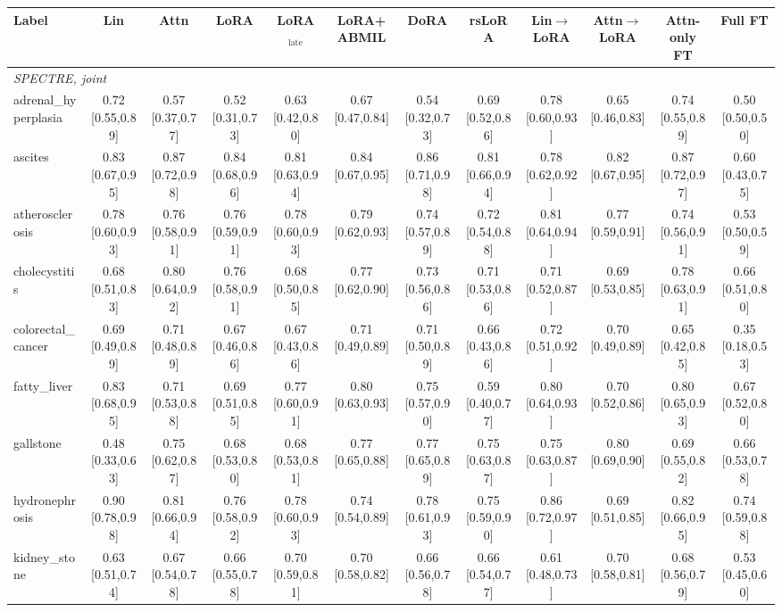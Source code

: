 \begin{tabular}{lccccccccccc}
\toprule
Label & Lin & Attn & LoRA & LoRA$_{\text{late}}$ & LoRA+ABMIL & DoRA & rsLoRA & Lin$\to$LoRA & Attn$\to$LoRA & Attn-only FT & Full FT \\
\midrule
\multicolumn{12}{l}{\textit{SPECTRE, joint}} \\
adrenal\_hyperplasia & 0.72 [0.55,0.89] & 0.57 [0.37,0.77] & 0.52 [0.31,0.73] & 0.63 [0.42,0.80] & 0.67 [0.47,0.84] & 0.54 [0.32,0.73] & 0.69 [0.52,0.86] & 0.78 [0.60,0.93] & 0.65 [0.46,0.83] & 0.74 [0.55,0.89] & 0.50 [0.50,0.50] \\
ascites & 0.83 [0.67,0.95] & 0.87 [0.72,0.98] & 0.84 [0.68,0.96] & 0.81 [0.63,0.94] & 0.84 [0.67,0.95] & 0.86 [0.71,0.98] & 0.81 [0.66,0.94] & 0.78 [0.62,0.92] & 0.82 [0.67,0.95] & 0.87 [0.72,0.97] & 0.60 [0.43,0.75] \\
atherosclerosis & 0.78 [0.60,0.93] & 0.76 [0.58,0.91] & 0.76 [0.59,0.91] & 0.78 [0.60,0.93] & 0.79 [0.62,0.93] & 0.74 [0.57,0.89] & 0.72 [0.54,0.88] & 0.81 [0.64,0.94] & 0.77 [0.59,0.91] & 0.74 [0.56,0.91] & 0.53 [0.50,0.59] \\
cholecystitis & 0.68 [0.51,0.83] & 0.80 [0.64,0.92] & 0.76 [0.58,0.91] & 0.68 [0.50,0.85] & 0.77 [0.62,0.90] & 0.73 [0.56,0.86] & 0.71 [0.53,0.86] & 0.71 [0.52,0.87] & 0.69 [0.53,0.85] & 0.78 [0.63,0.91] & 0.66 [0.51,0.80] \\
colorectal\_cancer & 0.69 [0.49,0.89] & 0.71 [0.48,0.89] & 0.67 [0.46,0.86] & 0.67 [0.43,0.86] & 0.71 [0.49,0.89] & 0.71 [0.50,0.89] & 0.66 [0.43,0.86] & 0.72 [0.51,0.92] & 0.70 [0.49,0.89] & 0.65 [0.42,0.85] & 0.35 [0.18,0.53] \\
fatty\_liver & 0.83 [0.68,0.95] & 0.71 [0.53,0.88] & 0.69 [0.51,0.85] & 0.77 [0.60,0.91] & 0.80 [0.63,0.93] & 0.75 [0.57,0.90] & 0.59 [0.40,0.77] & 0.80 [0.64,0.93] & 0.70 [0.52,0.86] & 0.80 [0.65,0.93] & 0.67 [0.52,0.80] \\
gallstone & 0.48 [0.33,0.63] & 0.75 [0.62,0.87] & 0.68 [0.53,0.80] & 0.68 [0.53,0.81] & 0.77 [0.65,0.88] & 0.77 [0.65,0.89] & 0.75 [0.63,0.87] & 0.75 [0.63,0.87] & 0.80 [0.69,0.90] & 0.69 [0.55,0.82] & 0.66 [0.53,0.78] \\
hydronephrosis & 0.90 [0.78,0.98] & 0.81 [0.66,0.94] & 0.76 [0.58,0.92] & 0.78 [0.60,0.93] & 0.74 [0.54,0.89] & 0.78 [0.61,0.93] & 0.75 [0.59,0.90] & 0.86 [0.72,0.97] & 0.69 [0.51,0.85] & 0.82 [0.66,0.95] & 0.74 [0.59,0.88] \\
kidney\_stone & 0.63 [0.51,0.74] & 0.67 [0.54,0.78] & 0.66 [0.55,0.78] & 0.70 [0.59,0.81] & 0.70 [0.58,0.82] & 0.66 [0.56,0.78] & 0.66 [0.54,0.77] & 0.61 [0.48,0.73] & 0.70 [0.58,0.81] & 0.68 [0.56,0.79] & 0.53 [0.45,0.60] \\

\end{tabular}
